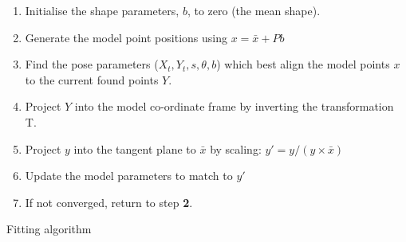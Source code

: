 \begin{algorithm}[h]
  \begin{enumerate}
  \item Initialise the shape parameters, $b$, to zero (the mean shape).
  \item Generate the model point positions using $x = \bar{x} + Pb$
  \item Find the pose parameters ($X_t, Y_t, s, \theta, b$) which best
    align the model points $x$ to the current found points $Y$.
  \item Project $Y$ into the model co-ordinate frame by inverting
    the transformation T.
  \item Project $y$ into the tangent plane to $\bar{x}$ by scaling:
    $y' = y/(y \times \bar{x})$
  \item Update the model parameters to match to $y'$
  \item If not converged, return to step \textbf{2}.
 \end{enumerate}
\caption{Fitting algorithm}
\end{algorithm}
